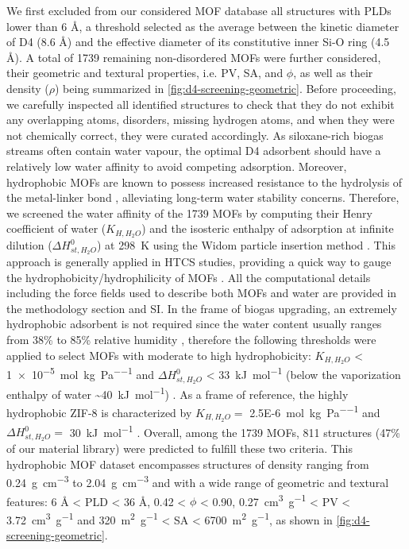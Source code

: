 We first excluded from our considered MOF database all structures with PLDs
lower than 6 Å, a threshold selected as the average between the kinetic diameter
of D4 (8.6 Å) and the effective diameter of its constitutive inner Si-O ring
(4.5 Å). A total of 1739 remaining non-disordered MOFs were further considered,
their geometric and textural properties, i.e. PV, SA, and \(\phi\), as well as
their density (\(\rho\)) being summarized in \cref{fig:d4-screening-geometric}.
Before proceeding, we carefully inspected all identified structures to check
that they do not exhibit any overlapping atoms, disorders, missing hydrogen
atoms, and when they were not chemically correct, they were curated accordingly.
As siloxane-rich biogas streams often contain water vapour, the optimal D4
adsorbent should have a relatively low water affinity to avoid competing
adsorption. Moreover, hydrophobic MOFs are known to possess increased resistance
to the hydrolysis of the metal-linker bond
\citep{burtchWaterStabilityAdsorption2014,
wuEnhancingStabilityMetalorganic2010}, alleviating long-term water stability
concerns. Therefore, we screened the water affinity of the 1739 MOFs by
computing their Henry coefficient of water (\(K_{H,H_{2}O}\)) and the isosteric
enthalpy of adsorption at infinite dilution (\(\Delta H_{st,H_{2}O}^{0}\)) at
\SI{298}{\kelvin} using the Widom particle insertion method
\citep{frenkelUnderstandingMolecularSimulation2002}. This approach is generally
applied in HTCS studies, providing a quick way to gauge the
hydrophobicity/hydrophilicity of MOFs
\citep{matito-martosDiscoveryOptimalPorous2018,
qiaoHighthroughputComputationalScreening2017}. All the computational details
including the force fields used to describe both MOFs and water are provided in
the methodology section and SI. In the frame of biogas upgrading, an extremely
hydrophobic adsorbent is not required since the water content usually ranges
from 38\% to 85\% relative humidity \citep{wangRecentAdvancesTechnologies2019},
therefore the following thresholds were applied to select MOFs with moderate to
high hydrophobicity: \(K_{H,H_{2}O}\) < \SI{1e-5}{\mol\per\kilo\gram\per\pascal}
and \(\Delta H_{st,H_{2}O}^{0}\) < \SI{33}{\kilo\joule\per\mol} (below the
vaporization enthalpy of water \textasciitilde \SI{40}{\kilo\joule\per\mol})
\citep{lemmonNISTStandardReference2018}. As a frame of reference, the highly
hydrophobic ZIF-8 is characterized by \(K_{H,H_{2}O} =\)
\SI{2.5E-6}{\mol\per\kilo\gram\per\pascal} and \(\Delta H_{st,H_{2}O}^{0} = \)
\SI{30}{\kilo\joule\per\mol}
\citep{moghadamEfficientIdentificationHydrophobic2016}. Overall, among the 1739
MOFs, 811 structures (47\% of our material library) were predicted to fulfill
these two criteria. This hydrophobic MOF dataset encompasses structures of
density ranging from \SI{0.24}{\gram\per\centi\metre\cubed} to
\SI{2.04}{\gram\per\centi\metre\cubed} and with a wide range of geometric and
textural features: 6 Å < PLD < 36 Å, 0.42 < \(\phi\) < 0.90,
\SI{0.27}{\centi\metre\cubed\per\gram} < PV <
\SI{3.72}{\centi\metre\cubed\per\gram} and \SI{320}{\metre\squared\per\gram} <
SA < \SI{6700}{\metre\squared\per\gram}, as shown in
\cref{fig:d4-screening-geometric}.

